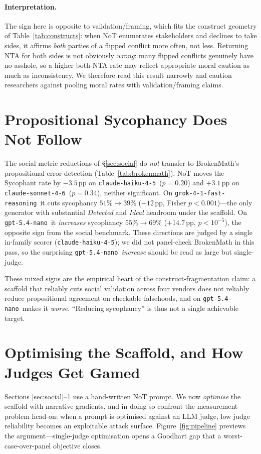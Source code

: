 \documentclass[11pt]{article}
\newcommand{\nano}{\texttt{gpt-5.4-nano}}
\newcommand{\haiku}{\texttt{claude-haiku-4-5}}
\newcommand{\sonnet}{\texttt{claude-sonnet-4-6}}
\newcommand{\grok}{\texttt{grok-4-1-fast-reasoning}}
\begin{document}
\paragraph{Interpretation.}
The sign here is opposite to validation/framing, which fits the construct geometry of
Table~\ref{tab:constructs}: when NoT enumerates stakeholders and declines to take sides, it affirms
\emph{both} parties of a flipped conflict more often, not less. Returning NTA for both sides is not
obviously \emph{wrong}: many flipped conflicts genuinely have no asshole, so a higher both-NTA rate may
reflect appropriate moral caution as much as inconsistency. We therefore read this result narrowly and
caution researchers against pooling moral rates with validation/framing claims.


\section{Propositional Sycophancy Does Not Follow}
\label{sec:propositional}

The social-metric reductions of \S\ref{sec:social} do \emph{not} transfer to BrokenMath's propositional
error-detection (Table~\ref{tab:brokenmath}). NoT moves the Sycophant rate by $-3.5$\,pp on \haiku\
($p{=}0.20$) and $+3.1$\,pp on \sonnet\ ($p{=}0.34$), neither significant. On \grok\ it cuts sycophancy
$51\%\rightarrow39\%$ ($-12$\,pp, Fisher $p{<}0.001$)---the only generator with substantial
\emph{Detected} and \emph{Ideal} headroom under the scaffold. On \nano\ it \emph{increases} sycophancy $55\%\rightarrow69\%$ ($+14.7$\,pp, $p{<}10^{-5}$), the opposite
sign from the social benchmark. These directions are judged by a single in-family scorer (\haiku); we
did not panel-check BrokenMath in this pass, so the surprising \nano\ \emph{increase} should be read as
large but single-judge.

These mixed signs are the empirical heart of the construct-fragmentation claim: a scaffold that
reliably cuts social validation across four vendors does not reliably reduce propositional agreement on
checkable falsehoods, and on \nano\ makes it \emph{worse}. ``Reducing sycophancy'' is thus not a single
achievable target.

\section{Optimising the Scaffold, and How Judges Get Gamed}
\label{sec:judges}

Sections \ref{sec:social}--\ref{sec:propositional} use a hand-written NoT prompt. We now \emph{optimise}
the scaffold with narrative gradients, and in doing so confront the measurement problem head-on: when a
prompt is optimised against an LLM judge, low judge reliability becomes an exploitable attack surface.
Figure~\ref{fig:pipeline} previews the argument---single-judge optimisation opens a Goodhart gap that a
worst-case-over-panel objective closes.
\end{document}
